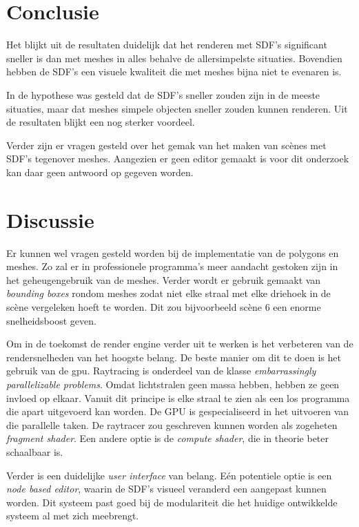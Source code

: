 \documentclass[12pt, a4paper]{article}
\begin{document}
\section{Conclusie}
Het blijkt uit de resultaten duidelijk dat het renderen met SDF's significant sneller is dan met meshes in alles behalve de allersimpelste situaties. Bovendien hebben de SDF's een visuele kwaliteit die met meshes bijna niet te evenaren is. 

In de hypothese was gesteld dat de SDF's sneller zouden zijn in de meeste situaties, maar dat meshes simpele objecten sneller zouden kunnen renderen. Uit de resultaten blijkt een nog sterker voordeel. 

Verder zijn er vragen gesteld over het gemak van het maken van scènes met SDF's tegenover meshes. Aangezien er geen editor gemaakt is voor dit onderzoek kan daar geen antwoord op gegeven worden.

\section{Discussie}

Er kunnen wel vragen gesteld worden bij de implementatie van de polygons en meshes. Zo zal er in professionele programma's meer aandacht gestoken zijn in het geheugengebruik van de meshes. Verder wordt er gebruik gemaakt van \textit{bounding boxes} rondom meshes zodat niet elke straal met elke driehoek in de scène vergeleken hoeft te worden.\cite{BoundingVolumeHierarchy} Dit zou bijvoorbeeld scène 6 een enorme snelheidsboost geven. 

Om in de toekomst de render engine verder uit te werken is het verbeteren van de rendersnelheden van het hoogste belang. De beste manier om dit te doen is het gebruik van de gpu. Raytracing is onderdeel van de klasse \textit{embarrassingly parallelizable problems}. Omdat lichtstralen geen massa hebben, hebben ze geen invloed op elkaar. Vanuit dit principe is elke straal te zien als een los programma die apart uitgevoerd kan worden. De GPU is gespecialiseerd in het uitvoeren van die parallelle taken. De raytracer zou geschreven kunnen worden als zogeheten \textit{fragment shader}. Een andere optie is de \textit{compute shader}, die in theorie beter schaalbaar is.

Verder is een duidelijke \textit{user interface} van belang. Eén potentiele optie is een \textit{node based editor}, waarin de SDF's visueel veranderd een aangepast kunnen worden. Dit systeem past goed bij de modulariteit die het huidige ontwikkelde systeem al met zich meebrengt.
\end{document}
